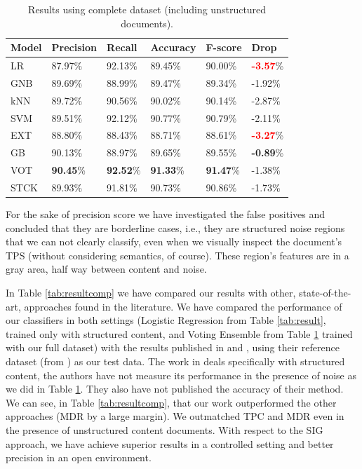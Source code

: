 \begin{table}[h]
\centering
\caption{Results using complete dataset (including unstructured documents).}
\label{tab:resultnoise}
\begin{tabular}{| l | l | l | l | l | l |}
\hline
Model & Precision & Recall & Accuracy & F-score & Drop \\ \hline
LR   & 87.97\% & 92.13\% & 89.45\% & 90.00\% & \textbf{\textcolor{red}{-3.57}}\% \\
GNB  & 89.69\% & 88.99\% & 89.47\% & 89.34\% & -1.92\% \\
kNN  & 89.72\% & 90.56\% & 90.02\% & 90.14\% & -2.87\% \\
SVM  & 89.51\% & 92.12\% & 90.77\% & 90.79\% & -2.11\% \\
EXT  & 88.80\% & 88.43\% & 88.71\% & 88.61\% & \textbf{\textcolor{red}{-3.27}}\% \\
GB   & 90.13\% & 88.97\% & 89.65\% & 89.55\% & \textbf{-0.89}\% \\
VOT  & \textbf{90.45}\% & \textbf{92.52}\% & \textbf{91.33}\% & \textbf{91.47}\% & -1.38\% \\
STCK & 89.93\% & 91.81\% & 90.73\% & 90.86\% & -1.73\% \\
\hline
\end{tabular}
\end{table}

For the sake of precision score we have investigated the false positives and
concluded that they are borderline cases, i.e., they are structured noise
regions that we can not clearly classify, even when we visually inspect the
document's TPS (without considering semantics, of course). These region's
features are in a gray area, half way between content and noise.
 
In Table \ref{tab:resultcomp} we have compared our results with other,
state-of-the-art, approaches found in the literature. We have compared the
performance of our classifiers in both settings (Logistic Regression from Table
\ref{tab:result}, trained only with structured content, and Voting Ensemble from
Table \ref{tab:resultnoise} trained with our full dataset) with the results
published in \cite{TPC09} and \cite{Velloso:2017:ERW:3132847.3132875}, using
their reference dataset (from \cite{yamada2004testbed}) as our test data.
The work in \cite{TPC09,Velloso:2017:ERW:3132847.3132875} deals specifically
with structured content, the authors have not measure its performance in the
presence of noise as we did in Table \ref{tab:resultnoise}. They also have not
published the accuracy of their method.
We can see, in Table \ref{tab:resultcomp}, that our work outperformed the other
approaches (MDR\cite{MDR03} by a large margin). We outmatched TPC and MDR
even in the presence of unstructured content documents. With respect to the
SIG\cite{Velloso:2017:ERW:3132847.3132875} approach, we have achieve superior
results in a controlled setting and better precision in an open environment.

